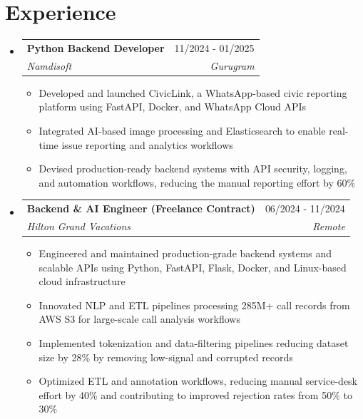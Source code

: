 \documentclass[letterpaper,11pt]{article}
\makeatletter
\newcommand{\resumeItem}[1]{
  \item\small{
    {#1 \vspace{-2pt}}
  }
}
\newcommand{\resumeSubheading}[4]{
  \vspace{-2pt}\item
    \begin{tabular*}{0.97\textwidth}[t]{l@{\extracolsep{\fill}}r}
      \textbf{#1} & #2 \\
      \textit{\small#3} & \textit{\small #4} \\
    \end{tabular*}\vspace{-7pt}
}
\newcommand{\resumeSubHeadingListStart}{\begin{itemize}[leftmargin=0.15in, label={}]}
\newcommand{\resumeSubHeadingListEnd}{\end{itemize}}
\newcommand{\resumeItemListStart}{\begin{itemize}}
\newcommand{\resumeItemListEnd}{\end{itemize}\vspace{-5pt}}
\makeatother
\begin{document}
\section{Experience}
        
  \resumeSubHeadingListStart

    \resumeSubheading
      {Python Backend Developer}{11/2024 - 01/2025}
      {Namdisoft}{Gurugram}
      \resumeItemListStart
        \resumeItem{Developed and launched CivicLink, a WhatsApp-based civic reporting platform using FastAPI, Docker, and WhatsApp Cloud APIs}
        \resumeItem{Integrated AI-based image processing and Elasticsearch to enable real-time issue reporting and analytics workflows}
        \resumeItem{Devised production-ready backend systems with API security, logging, and automation workflows, reducing the manual reporting effort by 60\%}
      \resumeItemListEnd

    \resumeSubheading
      {Backend \& AI Engineer (Freelance Contract) }{06/2024 - 11/2024}
      {Hilton Grand Vacations}{Remote}
      \resumeItemListStart
        \resumeItem{Engineered and maintained production-grade backend systems and scalable APIs using Python, FastAPI, Flask, Docker, and Linux-based cloud infrastructure}
        \resumeItem{Innovated NLP and ETL pipelines processing 285M+ call records from AWS S3 for large-scale call analysis workflows}
        \resumeItem{Implemented tokenization and data-filtering pipelines reducing dataset size by 28\% by removing low-signal and corrupted records}
        \resumeItem{Optimized ETL and annotation workflows, reducing manual service-desk effort by 40\% and contributing to improved rejection rates from 50\% to 30\%}
      \resumeItemListEnd
      




  \resumeSubHeadingListEnd


\end{document}
